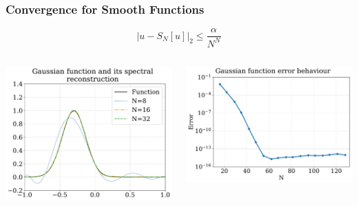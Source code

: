 \documentclass[]{beamer}
\newcommand{\norm}[1]{\left| #1 \right|_2}
\begin{document}
\begin{frame}
  \frametitle{Convergence for Smooth Functions}
  \begin{displaymath}
    \norm{u - S_N[u]} \leq \frac{\alpha}{N^{N}}
  \end{displaymath}
  \begin{columns}
    \begin{column}{0.5\textwidth}
      \begin{center}
        \includegraphics[width=\textwidth]{nogibbs}
      \end{center}
    \end{column}
    \begin{column}{0.5\textwidth}
      \begin{center}
        \includegraphics[width=\textwidth]{gaussian_error}
      \end{center}
    \end{column}
  \end{columns}
\end{frame}
\end{document}

